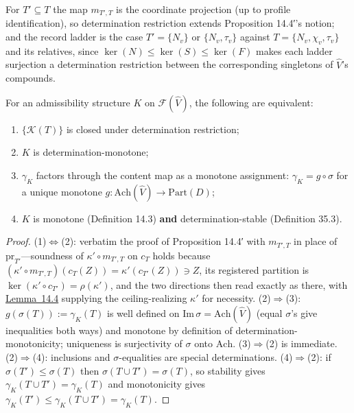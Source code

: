 For \(T' \subseteq T\) the map \(m_{T',T}\) is the coordinate projection (up to profile identification), so determination restriction extends Proposition 14.4′'s notion; and the record ladder is the case \(T' = \{N_v\}\) or \(\{N_v, \tau_v\}\) against \(T = \{N_v, \chi_v, \tau_v\}\) and its relatives, since \(\ker(N) \le \ker(S) \le \ker(F)\) makes each ladder surjection a determination restriction between the corresponding singletons of \(\widehat V\)'s compounds.

\begin{thmplain}

For an admissibility structure \(K\) on \(\mathcal{F}(\widehat{V})\), the following are equivalent:

\begin{enumerate}
\def\labelenumi{\arabic{enumi}.}
\tightlist
\item
  \(\{\mathcal{K}(T)\}\) is closed under determination restriction;
\item
  \(K\) is determination-monotone;
\item
  \(\gamma_K\) factors through the content map as a monotone assignment: \(\gamma_K = g \circ \sigma\) for a unique monotone \(g : \mathrm{Ach}(\widehat{V}) \to \mathrm{Part}(D)\);
\item
  \(K\) is monotone (Definition 14.3) \textbf{and} determination-stable (Definition 35.3).
\end{enumerate}
\end{thmplain}

\begin{proof}

(1)\(\Leftrightarrow\)(2): verbatim the proof of Proposition 14.4′ with \(m_{T',T}\) in place of \(\mathrm{pr}_{T'}\)---\hspace{0pt}soundness of \(\kappa' \circ m_{T',T}\) on \(c_T\) holds because \((\kappa' \circ m_{T',T})(c_T(Z)) = \kappa'(c_{T'}(Z)) \ni Z\), its registered partition is \(\ker(\kappa' \circ c_{T'}) = \rho(\kappa')\), and the two directions then read exactly as there, with \hyperlink{stmt:14.4}{Lemma~14.4} supplying the ceiling-realizing \(\kappa'\) for necessity. (2)\(\Rightarrow\)(3): \(g(\sigma(T)) := \gamma_K(T)\) is well defined on \(\mathrm{Im}\,\sigma = \mathrm{Ach}(\widehat V)\) (equal \(\sigma\)'s give inequalities both ways) and monotone by definition of determination-monotonicity; uniqueness is surjectivity of \(\sigma\) onto \(\mathrm{Ach}\). (3)\(\Rightarrow\)(2) is immediate. (2)\(\Rightarrow\)(4): inclusions and \(\sigma\)-equalities are special determinations. (4)\(\Rightarrow\)(2): if \(\sigma(T') \le \sigma(T)\) then \(\sigma(T \cup T') = \sigma(T)\), so stability gives \(\gamma_K(T \cup T') = \gamma_K(T)\) and monotonicity gives \(\gamma_K(T') \le \gamma_K(T \cup T') = \gamma_K(T)\).
\end{proof}

